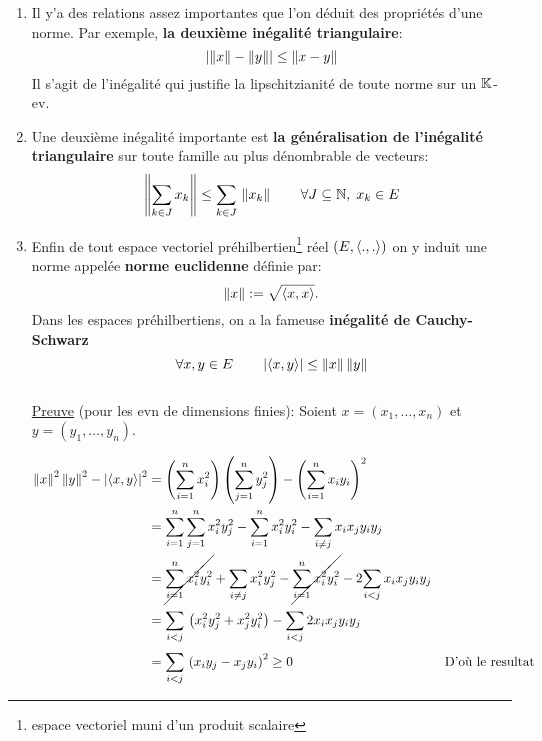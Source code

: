 \documentclass[12pt,a4paper]{article}
\begin{document}
	\begin{enumerate}
		
		\item Il y'a des relations assez importantes que l'on déduit des propriétés d'une norme. Par exemple, \textbf{la deuxième inégalité triangulaire}:
		\begin{equation}
			\abs{\norm{x}-\norm{y}}\leq \norm{x-y}
		\end{equation} 
		Il s'agit de l'inégalité qui justifie la lipschitzianité de toute norme sur un $\ens{K}$-ev.\\
		\item Une deuxième inégalité importante est \textbf{la généralisation de l'inégalité triangulaire} sur toute famille au plus dénombrable de vecteurs:
		\begin{equation}
			\norm{\grandm\somme{k\in J}{} x_k}\leq \somme{k \in J}{} \norm{x_k} \qquad \forall J\subseteq\ens{N}, \;  x_k\in E
		\end{equation}
		\item Enfin de tout espace vectoriel préhilbertien\footnote{espace vectoriel muni d'un produit scalaire} réel $\left(E,\prdtscal{.}{.}\right)$ on y induit une norme appelée \textbf{norme euclidenne} définie par:
		$$\norm{x}:=\sqrt{\prdtscal{x}{x}}. $$ 
		Dans les espaces préhilbertiens, on a la fameuse \textbf{inégalité de Cauchy-Schwarz}
		\begin{displaymath}
			\forall x,y \in E \qquad \abs{\prdtscal{x}{y}}\leq\norm{x}\norm{y}
		\end{displaymath}\\
		\underline{Preuve} (pour les evn de dimensions finies): Soient $x=\left(x_1,\dots, x_n\right) $ et $y=\left(y_1,\dots, y_n\right)$.
		
		\begin{align*}
			\norm{x}^2\norm{y}^2-\abs{\prdtscal{x}{y}}^2 & =  \left(\somme{i=1}{n} x_i^2\right)\left(\somme{j=1}{n} y_j^2\right)-\left(\somme{i=1}{n}x_iy_i\right)^2\\
			& =  \somme{i=1}{n}\somme{j=1}{n}x_i^2 y_j^2 -\somme{i=1}{n}x_i^2 y_i^2 -\somme{i\neq j}{} x_ix_jy_iy_j\\
			& = \cancel{\somme{i=1}{n}x_i^2 y_i^2} +\somme{i\neq j}{}x_i^2 y_j^2 -\cancel{\somme{i=1}{n}x_i^2 y_i^2} -2\somme{i<j}{} x_ix_jy_iy_j\\
			& = \somme{i<j}{}\left(x_i^2 y_j^2+x_j^2 y_i^2\right)-\somme{i<j}{} 2x_ix_jy_iy_j\\
			& = \somme{i<j}{}\left(x_i y_j-x_j y_i\right)^2\geq 0 & \text{D'où le resultat}
		\end{align*}
		
	\end{enumerate}
	
\end{document}
